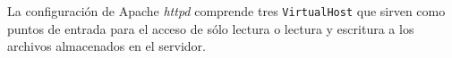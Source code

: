 La configuraci\'{o}n de Apache \textit{httpd} comprende tres \texttt{VirtualHost} que sirven como puntos de entrada para el acceso de s\'{o}lo lectura o lectura y escritura a los archivos almacenados en el servidor.

{
\begin{table}[H]
\caption{VirtualHost configurados en Apache HTTPD}{}
\label{tab:virtualhost}
\noindent{} %
\end{table}
}

